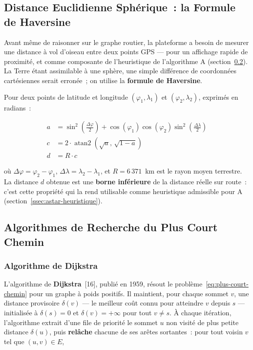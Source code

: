 \documentclass[12pt, a4paper]{report}
\begin{document}
\subsection{Distance Euclidienne Sphérique~: la Formule de Haversine}
\label{ssec:haversine}

Avant même de raisonner sur le graphe routier, la plateforme a besoin de
mesurer une distance \og à vol d'oiseau \fg{} entre deux points GPS --- pour
un affichage rapide de proximité, et comme composante de l'heuristique de
l'algorithme A\* (section~\ref{ssec:dijkstra-astar}). La Terre étant
assimilable à une sphère, une simple différence de coordonnées cartésiennes
serait erronée~; on utilise la \textbf{formule de Haversine}.

Pour deux points de latitude et longitude $(\varphi_1, \lambda_1)$ et
$(\varphi_2, \lambda_2)$, exprimés en radians~:

\begin{align}
  a &= \sin^2\!\left(\frac{\Delta\varphi}{2}\right)
       + \cos(\varphi_1)\cos(\varphi_2)\sin^2\!\left(\frac{\Delta\lambda}{2}\right) \label{eq:haversine-a}\\
  c &= 2 \cdot \operatorname{atan2}\!\left(\sqrt{a},\, \sqrt{1-a}\right) \label{eq:haversine-c}\\
  d &= R \cdot c \label{eq:haversine-d}
\end{align}

où $\Delta\varphi = \varphi_2 - \varphi_1$, $\Delta\lambda = \lambda_2 -
\lambda_1$, et $R = 6\,371$~km est le rayon moyen terrestre. La distance $d$
obtenue est une \textbf{borne inférieure} de la distance réelle sur route~:
c'est cette propriété qui la rend utilisable comme heuristique admissible
pour A\* (section~\ref{ssec:astar-heuristique}).

\subsection{Algorithmes de Recherche du Plus Court Chemin}
\label{ssec:dijkstra-astar}

\subsubsection{Algorithme de Dijkstra}

L'algorithme de \textbf{Dijkstra}~[16], publié en 1959, résout le
problème~\eqref{eq:plus-court-chemin} pour un graphe à poids positifs. Il
maintient, pour chaque sommet $v$, une
distance provisoire $\delta(v)$ --- le meilleur coût connu pour atteindre $v$
depuis $s$ --- initialisée à $\delta(s) = 0$ et $\delta(v) = +\infty$ pour
tout $v \neq s$. À chaque itération, l'algorithme extrait d'une file de
priorité le sommet $u$ non visité de plus petite distance $\delta(u)$, puis
\textbf{relâche} chacune de ses arêtes sortantes~: pour tout voisin $v$ tel
que $(u, v) \in E$,
\end{document}
